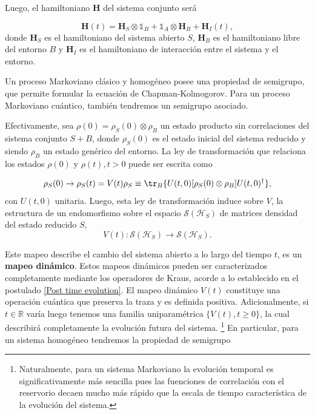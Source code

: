 Luego, el hamiltoniano $\mathbf{H}$ del sistema conjunto será 

\begin{equation}
\mathbf{H}(t)= \mathbf{H}_S \otimes \mathds{1}_B + \mathds{1}_A \otimes \mathbf{H}_B + \mathbf{H}_I (t),
\end{equation}
donde $\mathbf{H}_S$ es el hamiltoniano del sistema abierto $S$, $\mathbf{H}_B$ es el hamiltoniano libre del entorno $B$ y $\mathbf{H}_I$ es el hamiltoniano de interacción entre el sistema y el entorno. 

Un proceso Markoviano clásico y homogéneo posee una propiedad de semigrupo, que permite formular la ecuación de Chapman-Kolmogorov. Para un proceso Markoviano cuántico, también tendremos un semigrupo asociado.

Efectivamente, sea $\rho (0) = \rho_S (0) \otimes \rho_B$ un estado producto sin correlaciones del sistema conjunto $S+B$, donde $\rho_S(0)$ es el estado inicial del sistema reducido y siendo $\rho_B$ un estado genérico del entorno. La ley de transformación que relaciona los estados $\rho(0)$ y $\rho(t), t >0$ puede ser escrita como

\begin{equation}
    \rho_S (0) \rightarrow \rho_S (t) = V(t) \rho_S \equiv \tr_{B} \{U(t,0) [\rho_S(0) \otimes \rho_{B}]U(t,0)^{\dagger}\},
    \end{equation}
con $U(t,0)$ unitaria. Luego, esta ley de transformación induce sobre $V$, la estructura de un endomorfismo sobre el espacio $\mathcal{S}(\mathcal{H}_S)$ de matrices densidad del estado reducido $S$,
\begin{equation}
    V(t) : \mathcal{S}(\mathcal{H}_S) \rightarrow \mathcal{S}(\mathcal{H}_S).
\end{equation}

Este mapeo describe el cambio del sistema abierto a lo largo del tiempo $t$, es un \textbf{mapeo dinámico}. Estos mapeos dinámicos pueden ser caracterizados completamente mediante los operadores de Kraus, acorde a lo establecido en el postulado \ref{Post time evolution}. El mapeo dinámico $V(t)$ constituye una operación cuántica que preserva la traza y es definida positiva. Adicionalmente, si $t \in \mathbb{R}$ varía luego tenemos una familia uniparamétrica $\{V(t), t \geq 0\}$, la cual describirá completamente la evolución futura del sistema. \footnote{Naturalmente, para un sistema Markoviano la evolución temporal es significativamente más sencilla pues las fuenciones de correlación con el reservorio decaen mucho más rápido que la escala de tiempo característica de la evolución del sistema.} En particular, para un sistema homogéneo tendremos la propiedad de semigrupo

